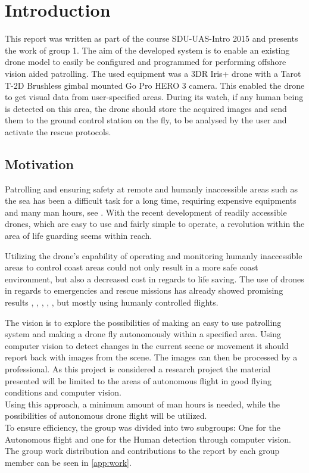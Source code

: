 \chapter*{Introduction}
This report was written as part of the course SDU-UAS-Intro 2015 and presents the work of group 1. 
The aim of the developed system is to enable an existing drone model to easily be configured and
programmed for performing offshore vision aided patrolling. 
The used equipment was a 3DR Iris+ drone with a Tarot T-2D Brushless gimbal mounted Go Pro HERO 3 camera.
This enabled the drone to get visual data from %
user-specified areas. %
During its watch, if any human being is detected on this area, the drone should store the acquired images and send
them to the ground control station on the fly, to be analysed by the user and activate the rescue protocols.

\section*{Motivation}
Patrolling and ensuring safety at remote and humanly inaccessible areas such as the sea has 
been a difficult task for a long time, requiring expensive equipments and many man hours,
see \cite{Ref:Drone2}.
With the recent development of readily accessible drones, which are easy to use and fairly simple to operate,
a revolution within the area of life guarding seems within reach. 

Utilizing the drone's capability of operating and monitoring humanly inaccessible areas to control coast areas
could not only result in a more safe coast environment, but also a decreased cost in regards to life saving.
The use of drones in regards to emergencies and rescue missions has already showed promising results
\cite{Ref:Drone1}, \cite{Ref:Drone3}, \cite{Ref:Drone4}, \cite{Ref:DroneResearch1}, \cite{Ref:DroneResearch1},
but mostly using humanly controlled flights.

The vision is to explore the possibilities of making an easy to use patrolling system
and making a drone fly autonomously within a specified area.
Using computer vision to detect changes in the current scene or movement it should report back with images from the scene.
The images can then be processed by a professional. As this project is considered a research project the material presented
will be limited to the areas of autonomous flight in good flying conditions and computer vision.
\\ 
Using this approach, a minimum amount of man hours is needed, while the possibilities of autonomous drone flight will be utilized.
\\
To ensure efficiency, the group was divided into two subgroups: One for the Autonomous flight and one for the Human detection through computer vision.
The group work distribution and contributions to the report by each group member can be seen in \ref{app:work}.

